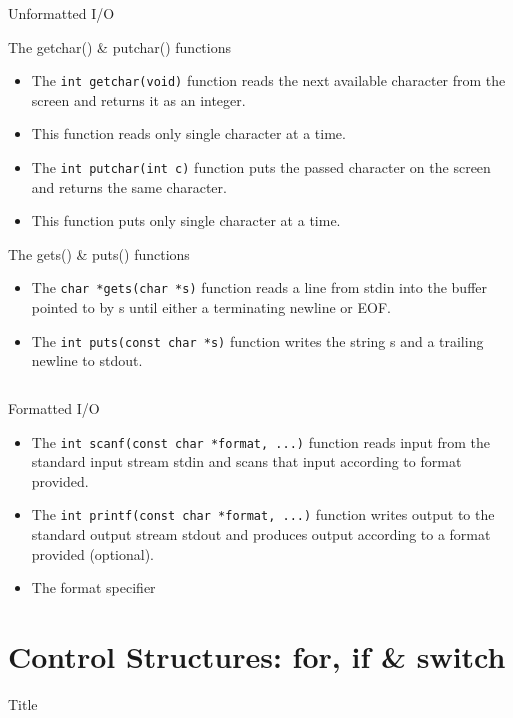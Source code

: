 \documentclass[10pt,t]{beamer}
\begin{document}
\begin{frame}[fragile]{Unformatted I/O}
  \begin{block}{The getchar() \& putchar() functions}
    \begin{itemize}
      \item The \lstinline|int getchar(void)| function reads the next available character from the screen and returns it as an integer. 
      \item[] This function reads only single character at a time.
      \item The \lstinline|int putchar(int c)| function puts the passed character on the screen and returns the same character. 
      \item[] This function puts only single character at a time. 
    \end{itemize}
  \end{block}

  \begin{block}{The gets() \& puts() functions}
    \begin{itemize}
      \item The \lstinline|char *gets(char *s)| function reads a line from stdin into the buffer pointed to by s until either a terminating newline or EOF.
      \item The \lstinline|int puts(const char *s)| function writes the string s and a trailing newline to stdout.
    \end{itemize}
  \end{block}
\end{frame}

\begin{frame}[fragile]
  \begin{columns}
    
    
  \end{columns}
\end{frame}

\begin{frame}[fragile]{Formatted I/O}
  \begin{itemize}
    \item The \lstinline|int scanf(const char *format, ...)| function reads input from the standard input stream stdin and scans that input according to format provided.
    \item The \lstinline|int printf(const char *format, ...)| function writes output to the standard output stream stdout and produces output according to a format provided (optional).
      
    \item The format specifier 
  \end{itemize}
\end{frame}

\section{Control Structures: for, if \& switch}
\begin{frame}{Title}

\end{frame}
\end{document}
